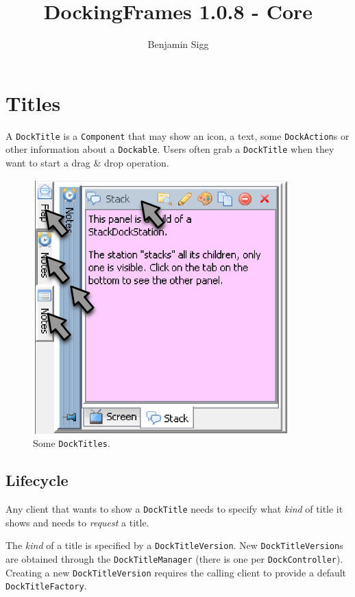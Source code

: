 \documentclass[a4paper,10pt]{article}
\title{DockingFrames 1.0.8 - Core}
\author{Benjamin Sigg}
\newcommand{\src}[1]{\texttt{#1}}
\begin{document}
\maketitle
\newpage

\tableofcontents
\newpage









\section{Titles} \label{sec:titles}
A \src{DockTitle} is a \src{Component} that may show an icon, a text, some \src{DockAction}s or other information about a \src{Dockable}. Users often grab a \src{DockTitle} when they want to start a drag \& drop operation.

\begin{figure}[h]
\centering
\includegraphics[scale=0.5]{titles}
\caption{Some \src{DockTitles}.}
\label{fig:titles}
\end{figure}

\subsection{Lifecycle}
Any client that wants to show a \src{DockTitle} needs to specify what \textit{kind} of title it shows and needs to \textit{request} a title.

The \textit{kind} of a title is specified by a \src{DockTitleVersion}. New \linebreak \src{DockTitleVersion}s are obtained through the \src{DockTitleManager} (there is one per \src{DockController}). Creating a new \src{DockTitleVersion} requires the calling client to provide a default \src{DockTitleFactory}.
\end{document}
